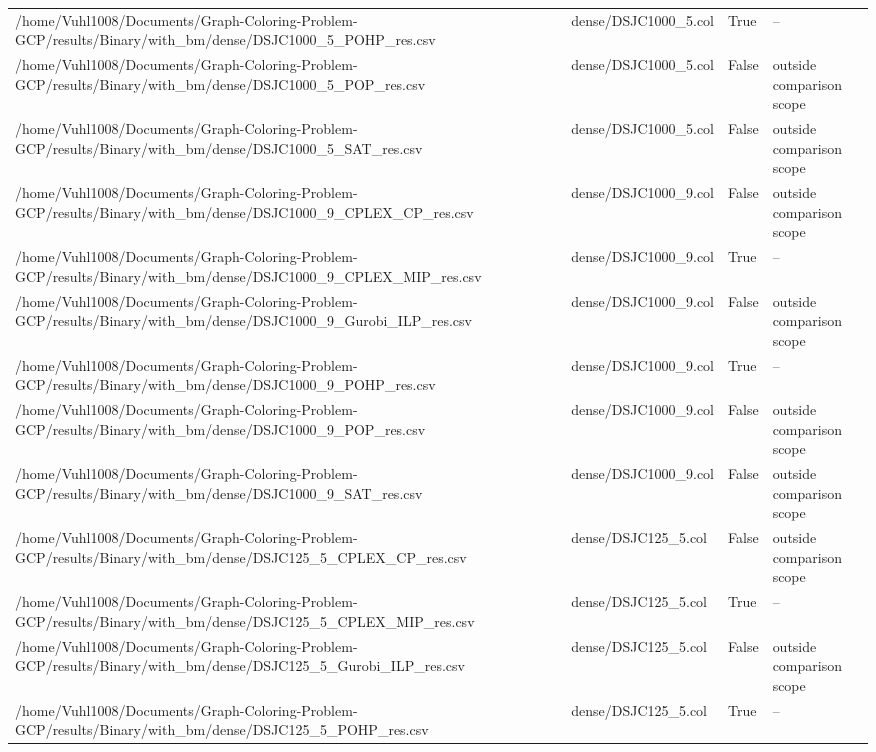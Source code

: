 \begin{table}[htbp]
\begin{tabular}{llll}
/home/Vuhl1008/Documents/Graph-Coloring-Problem-GCP/results/Binary/with\_bm/dense/DSJC1000\_5\_POHP\_res.csv & dense/DSJC1000\_5.col & True & -- \\
/home/Vuhl1008/Documents/Graph-Coloring-Problem-GCP/results/Binary/with\_bm/dense/DSJC1000\_5\_POP\_res.csv & dense/DSJC1000\_5.col & False & outside comparison scope \\
/home/Vuhl1008/Documents/Graph-Coloring-Problem-GCP/results/Binary/with\_bm/dense/DSJC1000\_5\_SAT\_res.csv & dense/DSJC1000\_5.col & False & outside comparison scope \\
/home/Vuhl1008/Documents/Graph-Coloring-Problem-GCP/results/Binary/with\_bm/dense/DSJC1000\_9\_CPLEX\_CP\_res.csv & dense/DSJC1000\_9.col & False & outside comparison scope \\
/home/Vuhl1008/Documents/Graph-Coloring-Problem-GCP/results/Binary/with\_bm/dense/DSJC1000\_9\_CPLEX\_MIP\_res.csv & dense/DSJC1000\_9.col & True & -- \\
/home/Vuhl1008/Documents/Graph-Coloring-Problem-GCP/results/Binary/with\_bm/dense/DSJC1000\_9\_Gurobi\_ILP\_res.csv & dense/DSJC1000\_9.col & False & outside comparison scope \\
/home/Vuhl1008/Documents/Graph-Coloring-Problem-GCP/results/Binary/with\_bm/dense/DSJC1000\_9\_POHP\_res.csv & dense/DSJC1000\_9.col & True & -- \\
/home/Vuhl1008/Documents/Graph-Coloring-Problem-GCP/results/Binary/with\_bm/dense/DSJC1000\_9\_POP\_res.csv & dense/DSJC1000\_9.col & False & outside comparison scope \\
/home/Vuhl1008/Documents/Graph-Coloring-Problem-GCP/results/Binary/with\_bm/dense/DSJC1000\_9\_SAT\_res.csv & dense/DSJC1000\_9.col & False & outside comparison scope \\
/home/Vuhl1008/Documents/Graph-Coloring-Problem-GCP/results/Binary/with\_bm/dense/DSJC125\_5\_CPLEX\_CP\_res.csv & dense/DSJC125\_5.col & False & outside comparison scope \\
/home/Vuhl1008/Documents/Graph-Coloring-Problem-GCP/results/Binary/with\_bm/dense/DSJC125\_5\_CPLEX\_MIP\_res.csv & dense/DSJC125\_5.col & True & -- \\
/home/Vuhl1008/Documents/Graph-Coloring-Problem-GCP/results/Binary/with\_bm/dense/DSJC125\_5\_Gurobi\_ILP\_res.csv & dense/DSJC125\_5.col & False & outside comparison scope \\
/home/Vuhl1008/Documents/Graph-Coloring-Problem-GCP/results/Binary/with\_bm/dense/DSJC125\_5\_POHP\_res.csv & dense/DSJC125\_5.col & True & -- \\

\end{tabular}
\end{table}
